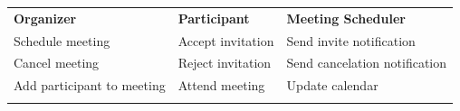 \begin{center}
{\def\LTcaptype{none} %
\begin{longtable}[]{@{}
>{\raggedright\arraybackslash} p{}
>{\raggedright\arraybackslash} p{}
>{\raggedright\arraybackslash} p{}@{}}
\toprule\noalign{}
\endhead
\bottomrule\noalign{}
\endlastfoot
\begin{minipage}[t]{\linewidth}\raggedright
\textbf{Organizer}
\end{minipage} & \begin{minipage}[t]{\linewidth}\raggedright
\textbf{Participant}
\end{minipage} & \begin{minipage}[t]{\linewidth}\raggedright
\textbf{Meeting Scheduler}
\end{minipage} \\
\begin{minipage}[t]{\linewidth}\raggedright
Schedule meeting
\end{minipage} & \begin{minipage}[t]{\linewidth}\raggedright
Accept invitation
\end{minipage} & \begin{minipage}[t]{\linewidth}\raggedright
Send invite notification
\end{minipage} \\
\begin{minipage}[t]{\linewidth}\raggedright
Cancel meeting
\end{minipage} & \begin{minipage}[t]{\linewidth}\raggedright
Reject invitation
\end{minipage} & \begin{minipage}[t]{\linewidth}\raggedright
Send cancelation notification
\end{minipage} \\
\begin{minipage}[t]{\linewidth}\raggedright
Add participant to meeting
\end{minipage} & \begin{minipage}[t]{\linewidth}\raggedright
Attend meeting
\end{minipage} & \begin{minipage}[t]{\linewidth}\raggedright
Update calendar
\end{minipage} \\
\begin{minipage}[t]{\linewidth}\raggedright

\end{minipage}
\end{longtable}}
\end{center}
